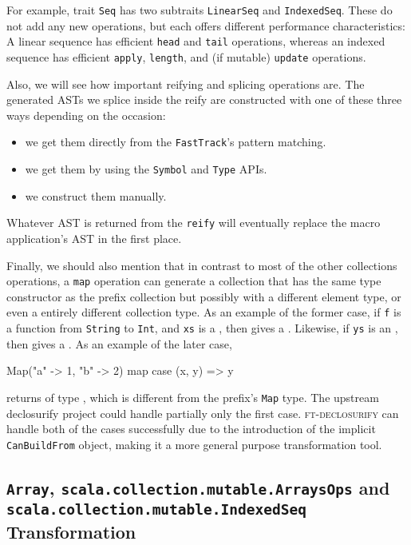 For example, trait \texttt{Seq} has two subtraits \texttt{LinearSeq} and \texttt{IndexedSeq}.
These do not add any new operations, but each offers different performance characteristics: A
linear sequence has efficient \texttt{head} and \texttt{tail} operations, whereas an indexed
sequence has efficient \texttt{apply}, \texttt{length}, and (if mutable) \texttt{update} operations. 

Also, we will see how important reifying and splicing operations are. The
generated ASTs we splice inside the reify are constructed with one of
these three ways depending on the occasion:
\begin{itemize}
 \item
  we get them directly from the \texttt{FastTrack}'s pattern matching.
 \item
  we get them by using the \texttt{Symbol} and \texttt{Type} APIs.
 \item
  we construct them manually.
\end{itemize}

Whatever AST is returned from the \texttt{reify} will eventually replace the macro
application's AST in the first place.

Finally, we should also mention that in contrast to most of the other collections operations, 
a \texttt{map} operation can generate a collection that has the same type constructor as the prefix
collection but possibly with a different element type, or even a entirely
different collection type. As an example of the former case, if \texttt{f} is a function
from \texttt{String} to \texttt{Int}, and \texttt{xs} is a , then  gives a .
Likewise, if \texttt{ys} is an , then  gives a . As an
example of the later case,
\begin{scalaCode}
 Map("a" -> 1, "b" -> 2) map { case (x, y) => y}
\end{scalaCode}
returns  of type ,
which is different from the prefix's \texttt{Map} type. The upstream declosurify project
could handle partially only the first case. \textsc{ft-declosurify} can handle both of
the cases successfully due to the introduction of the implicit \texttt{CanBuildFrom}
object, making it a more general purpose transformation tool.


\subsection{\texttt{Array}, \texttt{scala.collection.mutable.ArraysOps}  and
\texttt{scala.\allowbreak{}collection.\allowbreak{}mutable.\allowbreak{}IndexedSeq} Transformation}

